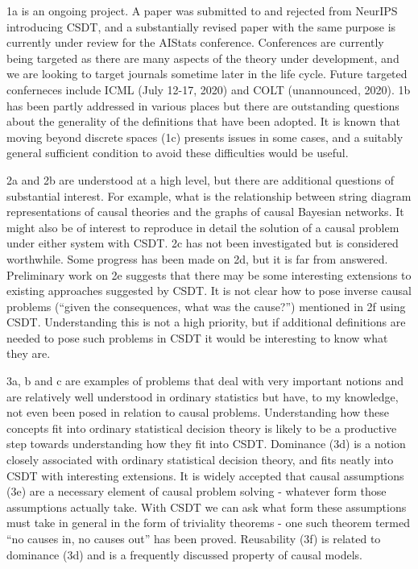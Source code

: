1a is an ongoing project. A paper was submitted to and rejected from NeurIPS introducing CSDT, and a substantially revised paper with the same purpose is currently under review for the AIStats conference. Conferences are currently being targeted as there are many aspects of the theory under development, and we are looking to target journals sometime later in the life cycle. Future targeted conferneces include ICML (July 12-17, 2020) and COLT (unannounced, 2020). 1b has been partly addressed in various places but there are outstanding questions about the generality of the definitions that have been adopted. It is known that moving beyond discrete spaces (1c) presents issues in some cases, and a suitably general sufficient condition to avoid these difficulties would be useful.

2a and 2b are understood at a high level, but there are additional questions of substantial interest. For example, what is the relationship between string diagram representations of causal theories and the graphs of causal Bayesian networks. It might also be of interest to reproduce in detail the solution of a causal problem under either system with CSDT. 2c has not been investigated but is considered worthwhile. Some progress has been made on 2d, but it is far from answered. Preliminary work on 2e suggests that there may be some interesting extensions to existing approaches suggested by CSDT. It is not clear how to pose inverse causal problems (``given the consequences, what was the cause?'') mentioned in 2f using CSDT. Understanding this is not a high priority, but if additional definitions are needed to pose such problems in CSDT it would be interesting to know what they are.

3a, b  and c are examples of problems that deal with very important notions and are relatively well understood in ordinary statistics but have, to my knowledge, not even been posed in relation to causal problems. Understanding how these concepts fit into ordinary statistical decision theory is likely to be a productive step towards understanding how they fit into CSDT. Dominance (3d) is a notion closely associated with ordinary statistical decision theory, and fits neatly into CSDT with interesting extensions. It is widely accepted that causal assumptions (3e) are a necessary element of causal problem solving - whatever form those assumptions actually take. With CSDT we can ask what form these assumptions must take in general in the form of triviality theorems - one such theorem termed ``no causes in, no causes out'' has been proved. Reusability (3f) is related to dominance (3d) and is a frequently discussed property of causal models.

